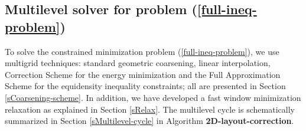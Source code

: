 \documentclass[final]{siamltex}
\begin{document}
\subsection{Multilevel solver for problem (\ref{full-ineq-problem})}\label{sMultSolver2}
\par To solve the constrained minimization problem (\ref{full-ineq-problem}), we use
multigrid techniques: standard geometric coarsening, linear
interpolation, Correction Scheme for the energy minimization and
the Full Approximation Scheme for the equidensity inequality
constraints; all are presented in Section
\ref{sCoarsening-scheme}. In addition, we have developed a fast
window minimization relaxation as explained in Section
\ref{sRelax}. The multilevel cycle is schematically summarized in
Section \ref{sMultilevel-cycle} in Algorithm {\bf
2D-layout-correction}.
\end{document}
